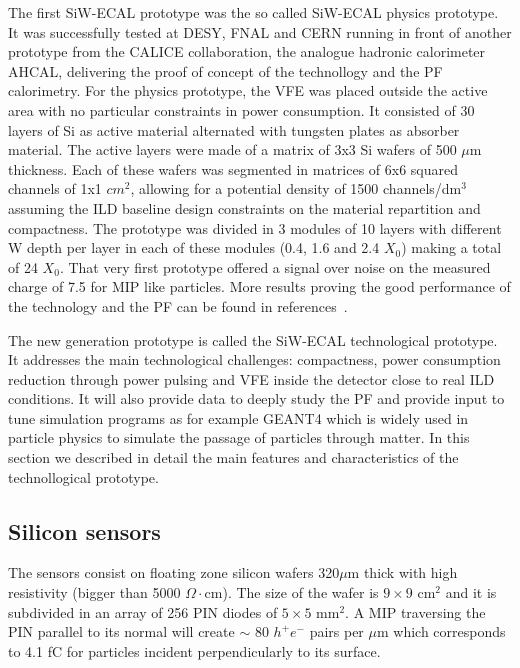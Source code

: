 \documentclass[a4paper,11pt]{article}
\begin{document}
The first SiW-ECAL prototype was the so called SiW-ECAL physics prototype.
It was successfully tested at DESY, FNAL and CERN running in front of another prototype from the CALICE
collaboration, the analogue hadronic calorimeter AHCAL, delivering the proof of concept of the technollogy
and the PF calorimetry.
For the physics prototype, the VFE was placed outside the active area with no particular constraints in power consumption.
It consisted of 30 layers of Si as active material alternated with tungsten plates as absorber material.
The active layers were made of a matrix of 3x3 Si wafers of 500 $\mu$m thickness. Each of these wafers was segmented in matrices of
6x6 squared channels of 1x1 $cm^{2}$, allowing for a potential density of 1500 channels/dm$^{3}$ assuming
the ILD baseline design constraints on the material repartition and compactness.
The prototype was divided in 3 modules of 10 layers with different W depth per layer in each of these modules
(0.4, 1.6 and 2.4 $X_{0}$) making a total of 24 $X_{0}$.
That very first prototype offered a signal over noise on the measured charge of 7.5 for MIP like 
particles. More results proving the good performance of the technology and the PF can be found in
references~\cite{Adloff:2011ha,Anduze:2008hq,Adloff:2008aa,Adloff:2010xj,CALICE:2011aa,Bilki:2014uep}.

The new generation prototype is called the SiW-ECAL technological prototype. It addresses the main technological challenges: compactness,
power consumption reduction through power pulsing and VFE inside the detector close to real ILD conditions.
It will also provide data to deeply study the PF and provide input to tune simulation programs as for example
GEANT4\cite{Agostinelli:2002hh,Allison:2006ve,Allison:2016lfl} which is widely used
in particle physics to simulate the passage of particles through matter. In this section we described in detail
the main features and characteristics of the technollogical prototype.

\subsection{Silicon sensors}
\label{sec:wafers}

The sensors consist on floating zone silicon wafers 320$\mu$m thick with high resistivity (bigger than 5000 $\Omega\cdot$cm).
The size of the wafer is $9\times9$ cm$^{2}$ and it is subdivided in an array of 256 PIN diodes of $5\times5$ mm$^{2}$.
A MIP traversing the PIN parallel to its normal will create $\sim$ 80 $h^{+}e^{-}$ pairs per $\mu$m which corresponds to 4.1 fC
for particles incident perpendicularly to its surface.
\end{document}
